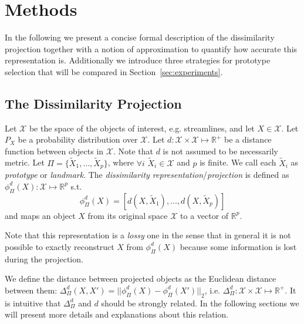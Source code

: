 \section{Methods}
\label{sec:methods}

In the following we present a concise formal description of the
dissimilarity projection together with a notion of approximation to
quantify how accurate this representation is. Additionally we
introduce three strategies for prototype selection that will be
compared in Section~\ref{sec:experiments}.

\subsection{The Dissimilarity Projection}

Let $\mathcal{X}$ be the space of the objects of interest,
e.g. streamlines, and let $X \in \mathcal{X}$. Let $P_X$ be a
probability distribution over $\mathcal{X}$. Let $d:\mathcal{X} \times
\mathcal{X} \mapsto \mathbb{R}^+$ be a distance function between
objects in $\mathcal{X}$. Note that $d$ is not assumed to be
necessarily metric. Let $\Pi = \{\tilde{X}_1, \ldots, \tilde{X}_p\}$,
where $\forall i$ $\tilde{X}_i \in \mathcal{X}$ and $p$ is finite. We
call each $\tilde{X}_i$ as \emph{prototype} or \emph{landmark}. The
\emph{dissimilarity representation}/\emph{projection} is defined as
$\phi_{\Pi}^d(X):\mathcal{X} \mapsto \mathbb{R}^p$
s.t. 
\begin{equation}
  \phi_{\Pi}^d(X) = [d(X,\tilde{X}_1) ,\ldots, d(X,\tilde{X}_p)]
\label{eq:dissimilarity_representation}
\end{equation}
and maps an object $X$ from its original space $\mathcal{X}$ to a
vector of $\mathbb{R}^p$.

Note that this representation is a \emph{lossy} one in the sense that
in general it is not possible to exactly reconstruct $X$ from
$\phi_{\Pi}^d(X)$ because some information is lost during the
projection.

We define the distance between projected objects as the Euclidean
distance between them: $\Delta_{\Pi}^d(X, X') = || \phi_{\Pi}^d(X) -
\phi_{\Pi}^d(X') ||_2$, i.e. $\Delta_{\Pi}^d:\mathcal{X} \times
\mathcal{X} \mapsto \mathbb{R}^+$. It is intuitive that
$\Delta_{\Pi}^d$ and $d$ should be strongly related. In the following
sections we will present more details and explanations about this
relation.

